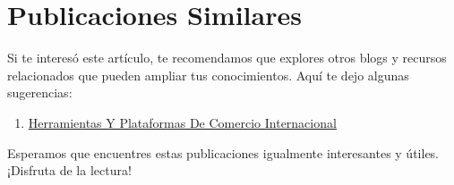 \documentclass[
  jou,
  floatsintext,
  longtable,
  a4paper,
  nolmodern,
  notxfonts,
  notimes,
  12pt,
  colorlinks=true,linkcolor=blue,citecolor=blue,urlcolor=blue]{apa7}
\providecommand{\tightlist}{%
  \setlength{\itemsep}{0pt}\setlength{\parskip}{0pt}}
\begin{document}
\section{Publicaciones Similares}\label{publicaciones-similares}

Si te interesó este artículo, te recomendamos que explores otros blogs y
recursos relacionados que pueden ampliar tus conocimientos. Aquí te dejo
algunas sugerencias:

\begin{enumerate}
\def\labelenumi{\arabic{enumi}.}
\tightlist
\item
  \href{https://actus-mercator.netlify.app/inteligencia-comercial/2025-05-15-herramientas-y-plataformas-de-comercio-internacional/index.pdf}{}
  \href{https://actus-mercator.netlify.app/inteligencia-comercial/2025-05-15-herramientas-y-plataformas-de-comercio-internacional}{Herramientas
  Y Plataformas De Comercio Internacional}
\end{enumerate}

Esperamos que encuentres estas publicaciones igualmente interesantes y
útiles. ¡Disfruta de la lectura!
\end{document}
